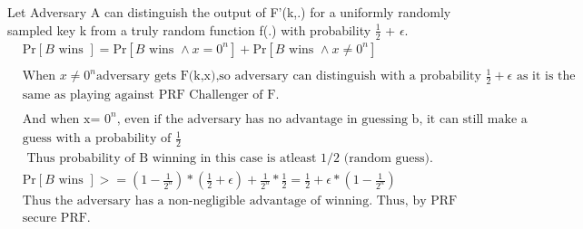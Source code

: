 \documentclass{article}
\begin{document}
\\ \\
Let Adversary A can distinguish the output of F'(k,.) for a uniformly randomly sampled key k from a truly random function f(.) with probability $\frac{1}{2}$ + $\epsilon$. \\
\[
\begin{aligned}
    &\text{Pr}[B \text{ wins }] = \text{Pr}[ B \text{ wins } \land x = 0^n] +  \text{Pr}[ B \text{ wins } \land x \neq 0^n] \\ \\
    &\text{When } x \neq 0^n  \text{adversary gets F(k,x),so adversary can distinguish with a probability } \frac{1}{2} + \epsilon \text{ as it is the} \\
    &\text{same as playing against PRF Challenger of F}. \\ \\
    &\text{And when x= $0^n$, even if the adversary has no advantage in guessing b, it can still make a random} \\
    &\text{guess with a probability of $\frac{1}{2}$ } \\
    &\text{ Thus probability of B winning in this case is atleast 1/2 (random guess).} \\
    &\text{Pr}[B \text{ wins }] >= (1- \frac{1}{2^n}) * (\frac{1}{2} + \epsilon) +  \frac{1}{2^n} * \frac{1}{2} = \frac{1}{2} + \epsilon* (1-\frac{1}{2^n}) \\
    &\text{Thus the adversary has a non-negligible advantage of winning. Thus, by PRF Security of F, F' is a} \\
    &\text{secure PRF. }
\end{aligned}
\]
\end{document}
